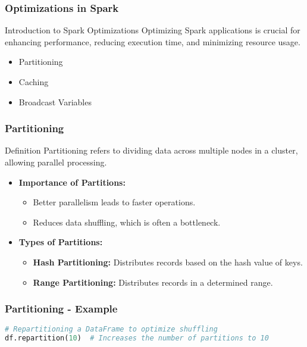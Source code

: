\documentclass[aspectratio=169]{beamer}
\begin{document}
\begin{frame}
    \frametitle{Optimizations in Spark}
    \begin{block}{Introduction to Spark Optimizations}
        Optimizing Spark applications is crucial for enhancing performance, reducing execution time, and minimizing resource usage.
    \end{block}
    \begin{itemize}
        \item Partitioning
        \item Caching
        \item Broadcast Variables
    \end{itemize}
\end{frame}

\begin{frame}
    \frametitle{Partitioning}
    \begin{block}{Definition}
        Partitioning refers to dividing data across multiple nodes in a cluster, allowing parallel processing.
    \end{block}
    \begin{itemize}
        \item \textbf{Importance of Partitions:}
            \begin{itemize}
                \item Better parallelism leads to faster operations.
                \item Reduces data shuffling, which is often a bottleneck.
            \end{itemize}
        \item \textbf{Types of Partitions:}
            \begin{itemize}
                \item \textbf{Hash Partitioning:} Distributes records based on the hash value of keys.
                \item \textbf{Range Partitioning:} Distributes records in a determined range.
            \end{itemize}
    \end{itemize}
\end{frame}

\begin{frame}[fragile]
    \frametitle{Partitioning - Example}
    \begin{lstlisting}[language=Python]
# Repartitioning a DataFrame to optimize shuffling
df.repartition(10)  # Increases the number of partitions to 10
    \end{lstlisting}
\end{frame}
\end{document}
